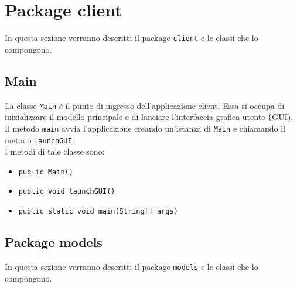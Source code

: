 \section{Package client}
In questa sezione verranno descritti il package \texttt{client} e le classi che lo compongono.\\

\subsection{Main}
La classe \texttt{Main} è il punto di ingresso dell'applicazione client.
Essa si occupa di inizializzare il modello principale e di lanciare l'interfaccia grafica utente \texttt(GUI).
Il metodo \texttt{main} avvia l'applicazione creando un'istanza di \texttt{Main} e chiamando il metodo \texttt{launchGUI}.\\
I metodi di tale classe sono:
\begin{itemize}
    \item \texttt{public Main()}
    \item \texttt{public void launchGUI()}
    \item \texttt{public static void main(String[] args)}
\end{itemize}

\subsection{Package models}
In questa sezione verranno descritti il package \texttt{models} e le classi che lo compongono.\\


